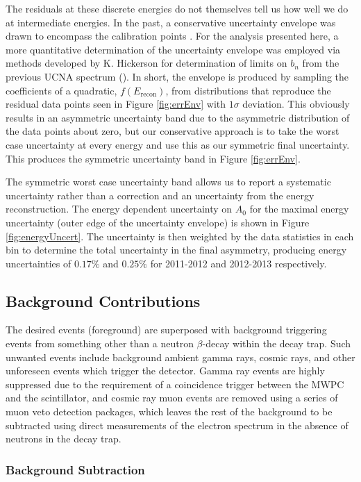 The residuals at these discrete energies do not
themselves tell us how well we do at intermediate energies. In the past, a conservative
uncertainty envelope was drawn to encompass the calibration points
\cite{mendenhall2013,mpmThesis}. For the analysis
presented here, a more quantitative determination of the uncertainty envelope was employed
via methods developed by K. Hickerson for determination of limits on $b_n$ from the previous
UCNA spectrum (\cite{hickerson2017}). In short, the envelope is produced by sampling
the coefficients of a quadratic, $f(E_{\mathrm{recon}})$, from distributions that reproduce
the residual data points seen in Figure \ref{fig:errEnv} with $1\sigma$ deviation.
This
obviously results in an asymmetric uncertainty band due to the asymmetric distribution
of the data points about zero, but our conservative approach is
to take the worst case uncertainty at every energy and use this as our
symmetric final uncertainty.
This produces the symmetric uncertainty band in Figure \ref{fig:errEnv}.

The symmetric worst case uncertainty band allows us to report a systematic uncertainty
rather than a correction and an uncertainty from the energy reconstruction. The energy
dependent uncertainty on $A_0$ for the maximal energy uncertainty (outer edge of the
uncertainty envelope) is shown in Figure \ref{fig:energyUncert}.
The uncertainty is then weighted by the data statistics in each bin to determine the
total uncertainty in the final asymmetry, producing energy uncertainties of $0.17\%$ and
$0.25\%$ for 2011-2012 and 2012-2013 respectively.

\subsection{Background Contributions}

The desired events (foreground) are superposed with background
triggering events from something other
than a neutron $\beta$-decay within the decay trap. Such unwanted events include
background ambient
gamma rays, cosmic rays,
and other unforeseen events which trigger the detector.
Gamma ray events are highly suppressed due to the
requirement of a coincidence trigger between the MWPC and the scintillator,
and cosmic ray muon events are removed using a series of muon veto
detection packages, which leaves the rest of the background to be subtracted using direct
measurements of the electron spectrum in the absence of neutrons in the decay trap.

\subsubsection{Background Subtraction}

